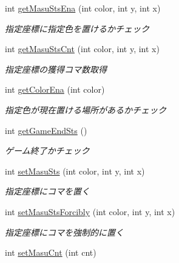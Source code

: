 \begin{DoxyCompactItemize}
int \mbox{\hyperlink{classjp_1_1gr_1_1java__conf_1_1yuta__yoshinaga_1_1reversi_1_1model_1_1_reversi_a055f20327e781b1f6807dba0baa1e51b}{get\+Masu\+Sts\+Ena}} (int color, int y, int x)
\begin{DoxyCompactList}\small\item\em 指定座標に指定色を置けるかチェック \end{DoxyCompactList}\item 
int \mbox{\hyperlink{classjp_1_1gr_1_1java__conf_1_1yuta__yoshinaga_1_1reversi_1_1model_1_1_reversi_a1a528710342faba65975f4768d24b129}{get\+Masu\+Sts\+Cnt}} (int color, int y, int x)
\begin{DoxyCompactList}\small\item\em 指定座標の獲得コマ数取得 \end{DoxyCompactList}\item 
int \mbox{\hyperlink{classjp_1_1gr_1_1java__conf_1_1yuta__yoshinaga_1_1reversi_1_1model_1_1_reversi_ac6fafa41eeff56abfc67b2b5876b50f9}{get\+Color\+Ena}} (int color)
\begin{DoxyCompactList}\small\item\em 指定色が現在置ける場所があるかチェック \end{DoxyCompactList}\item 
int \mbox{\hyperlink{classjp_1_1gr_1_1java__conf_1_1yuta__yoshinaga_1_1reversi_1_1model_1_1_reversi_abc97a3ba932ee271cf04ff0f72162100}{get\+Game\+End\+Sts}} ()
\begin{DoxyCompactList}\small\item\em ゲーム終了かチェック \end{DoxyCompactList}\item 
int \mbox{\hyperlink{classjp_1_1gr_1_1java__conf_1_1yuta__yoshinaga_1_1reversi_1_1model_1_1_reversi_a7abf9238b933653eec2908f6e1a863db}{set\+Masu\+Sts}} (int color, int y, int x)
\begin{DoxyCompactList}\small\item\em 指定座標にコマを置く \end{DoxyCompactList}\item 
int \mbox{\hyperlink{classjp_1_1gr_1_1java__conf_1_1yuta__yoshinaga_1_1reversi_1_1model_1_1_reversi_af2ba1c808c067c94106d04ccd5e25e3b}{set\+Masu\+Sts\+Forcibly}} (int color, int y, int x)
\begin{DoxyCompactList}\small\item\em 指定座標にコマを強制的に置く \end{DoxyCompactList}\item 
int \mbox{\hyperlink{classjp_1_1gr_1_1java__conf_1_1yuta__yoshinaga_1_1reversi_1_1model_1_1_reversi_a0e9bc15d570635cf024287fbf541b4b9}{set\+Masu\+Cnt}} (int cnt)

\end{DoxyCompactItemize}
